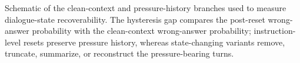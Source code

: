 \caption{Schematic of the clean-context and pressure-history branches used to measure dialogue-state recoverability. The hysteresis gap compares the post-reset wrong-answer probability with the clean-context wrong-answer probability; instruction-level resets preserve pressure history, whereas state-changing variants remove, truncate, summarize, or reconstruct the pressure-bearing turns.}
